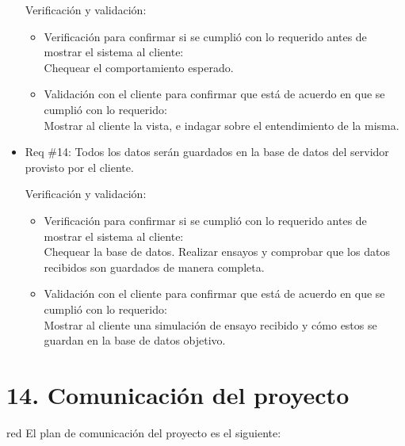 \documentclass[11pt]{charter}
\begin{document}
\begin{itemize}
Verificación y validación:

\begin{itemize}
\item Verificación para confirmar si se cumplió con lo requerido antes de mostrar el sistema al cliente:\\
Chequear el comportamiento esperado.
\item Validación con el cliente para confirmar que está de acuerdo en que se cumplió con lo requerido:\\
Mostrar al cliente la vista, e indagar sobre el entendimiento de la misma.
\end{itemize}

\item Req \#14: Todos los datos serán guardados en la base de datos del servidor provisto por el cliente.

Verificación y validación:

\begin{itemize}
\item Verificación para confirmar si se cumplió con lo requerido antes de mostrar el sistema al cliente:\\
Chequear la base de datos. Realizar ensayos y comprobar que los datos recibidos son guardados de manera completa.
\item Validación con el cliente para confirmar que está de acuerdo en que se cumplió con lo requerido:\\
Mostrar al cliente una simulación de ensayo recibido y cómo estos se guardan en la base de datos objetivo.
\end{itemize}


\end{itemize}



\section{14. Comunicación del proyecto}
\label{sec:comunicaciones}

\begin{consigna}{red}
El plan de comunicación del proyecto es el siguiente:
\end{consigna}
\end{document}
